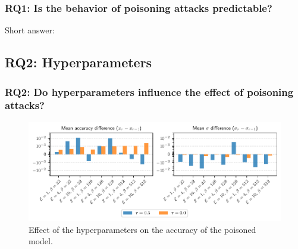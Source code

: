 \documentclass[color,t,presentation,english,aspectratio=169]{beamer}
\begin{document}

\begin{frame}
	\frametitle{RQ1: Is the behavior of poisoning attacks predictable?}

	Short answer: \onslide<2->{Nope.}

	\vspace{1\baselineskip}

\end{frame}

\subsection{RQ2: Hyperparameters}

\begin{frame}
	\frametitle{RQ2: Do hyperparameters influence the effect of poisoning attacks?}

	\begin{figure}
		\centering
		\includegraphics[width=.8\textwidth]{figures/hyperparams-continous-cicids-small.pdf}
		\caption{Effect of the hyperparameters on the accuracy of the poisoned model.}
	\end{figure}
\end{frame}
\end{document}
